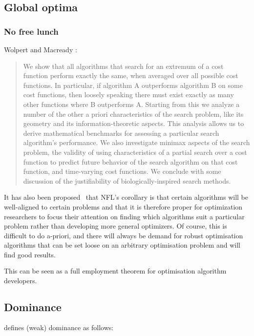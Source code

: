 \subsection{Global optima}

\subsubsection{No free lunch}
Wolpert and Macready \citehere:

\begin{quote}
  We show that all algorithms that search for an extremum of a cost function perform exactly the same, when averaged over all possible cost functions. In particular, if algorithm A outperforms algorithm B on some cost functions, then loosely speaking there must exist exactly as many other functions where B outperforms A.
Starting from this we analyze a number of the other a priori characteristics of the search problem, like its geometry and its information-theoretic aspects.
This analysis allows us to derive mathematical benchmarks for assessing a particular search algorithm's performance.
We also investigate minimax aspects of the search problem, the validity of using characteristics of a partial search over a cost function to predict future behavior of the search algorithm on that cost function, and time-varying cost functions.
We conclude with some discussion of the justifiability of biologically-inspired search methods.
\end{quote}

It has also been proposed \citehere\ that NFL's corollary is that certain algorithms will be well-aligned to certain problems and that it is therefore proper for optimization researchers to focus their attention on finding which algorithms suit a particular problem rather than developing more general optimizers. Of course, this is difficult to do a-priori, and there will always be demand for robust optimisation algorithms that can be set loose on an arbitrary optimisation problem and will find good results.

This can be seen as a full employment theorem for optimisation algorithm developers. %

\subsection{Dominance}
\citet[28]{deb.kalyanmoy2001multi-objective} defines (weak) dominance as follows:

